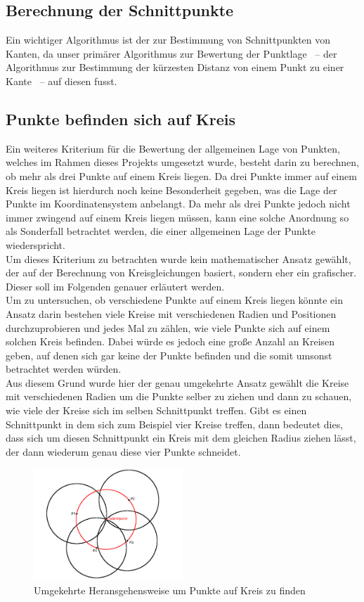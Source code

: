 \documentclass[a4paper,twocolumn]{scrartcl}
\begin{document}
\subsection{Berechnung der Schnittpunkte}
Ein wichtiger Algorithmus ist der zur Bestimmung von Schnittpunkten von Kanten, da unser primärer Algorithmus zur Bewertung der Punktlage ~-- der Algorithmus zur Bestimmung der kürzesten Distanz von einem Punkt zu einer Kante ~-- auf diesen fusst.  
\subsection{Punkte befinden sich auf Kreis}
Ein weiteres Kriterium für die Bewertung der allgemeinen Lage von Punkten, welches im Rahmen dieses Projekts umgesetzt wurde, besteht darin zu berechnen, ob mehr als drei Punkte auf einem Kreis liegen. Da drei Punkte immer auf einem Kreis liegen ist hierdurch noch keine Besonderheit gegeben, was die Lage der Punkte im Koordinatensystem anbelangt. Da mehr als drei Punkte jedoch nicht immer zwingend auf einem Kreis liegen müssen, kann eine solche Anordnung so als Sonderfall betrachtet werden, die einer allgemeinen Lage der Punkte wiederspricht.\\
Um dieses Kriterium zu betrachten wurde kein mathematischer Ansatz gewählt, der auf der Berechnung von Kreisgleichungen basiert, sondern eher ein grafischer. Dieser soll im Folgenden genauer erläutert werden.\\
Um zu untersuchen, ob verschiedene Punkte auf einem Kreis liegen könnte ein Ansatz darin bestehen viele Kreise mit verschiedenen Radien und Positionen durchzuprobieren und jedes Mal zu zählen, wie viele Punkte sich auf einem solchen Kreis befinden. Dabei würde es jedoch eine große Anzahl an Kreisen geben, auf denen sich gar keine der Punkte befinden und die somit umsonst betrachtet werden würden.\\
Aus diesem Grund wurde hier der genau umgekehrte Ansatz gewählt die Kreise mit verschiedenen Radien um die Punkte selber zu ziehen und dann zu schauen, wie viele der Kreise sich im selben Schnittpunkt treffen. Gibt es einen Schnittpunkt in dem sich zum Beispiel vier Kreise treffen, dann bedeutet dies, dass sich um diesen Schnittpunkt ein Kreis mit dem gleichen Radius ziehen lässt, der dann wiederum genau diese vier Punkte schneidet.
 
\begin{figure}[h]
\centering
\includegraphics[width=0.5\textwidth]{Bilder/kreise}
\caption{Umgekehrte Heransgehensweise um Punkte auf Kreis zu finden}
\label{img:kreise}
\end{figure}
\end{document}

